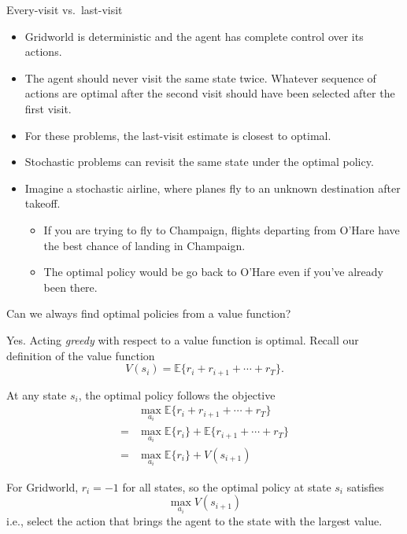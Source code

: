 \documentclass[9pt]{beamer}
\newcommand\pskip{\pause\bigskip}
\begin{document}
\begin{frame}{Every-visit vs.\ last-visit}

\begin{itemize}
	\item Gridworld is deterministic and the agent has complete control over its actions.
	\item The agent should never visit the same state twice. Whatever sequence of actions are optimal after the second visit should have been selected after the first visit.
	\item For these problems, the last-visit estimate is closest to optimal.
\end{itemize}

\pskip
\begin{itemize}
	\item Stochastic problems can revisit the same state under the optimal policy.
	\item Imagine a stochastic airline, where planes fly to an unknown destination after takeoff.
	\begin{itemize}
		\item If you are trying to fly to Champaign, flights departing from O'Hare have the best chance of landing in Champaign.
		\item The optimal policy would be go back to O'Hare even if you've already been there.
	\end{itemize}
\end{itemize}

\end{frame}

\begin{frame}{Can we always find optimal policies from a value function?}

Yes. Acting \emph{greedy} with respect to a value function is optimal. Recall our definition of the value function
\[ V(s_i) = \mathbb{E}\{ r_i + r_{i+1} + \cdots + r_T \}. \]

\pskip
At any state $s_i$, the optimal policy follows the objective
\begin{align*} 
	 & \max_{a_i} \mathbb{E}\{ r_i + r_{i+1} + \cdots + r_T \} \\
	=& \max_{a_i} \mathbb{E}\{r_i\} + \mathbb{E}\{r_{i+1} + \cdots + r_T \} \\
	=& \max_{a_i} \mathbb{E}\{r_i\} + V(s_{i+1})
\end{align*}

\pause
For Gridworld, $r_i=-1$ for all states, so the optimal policy at state $s_i$ satisfies
\[ \max_{a_i} V(s_{i+1}) \]
i.e., select the action that brings the agent to the state with the largest value.

\end{frame}
\end{document}
